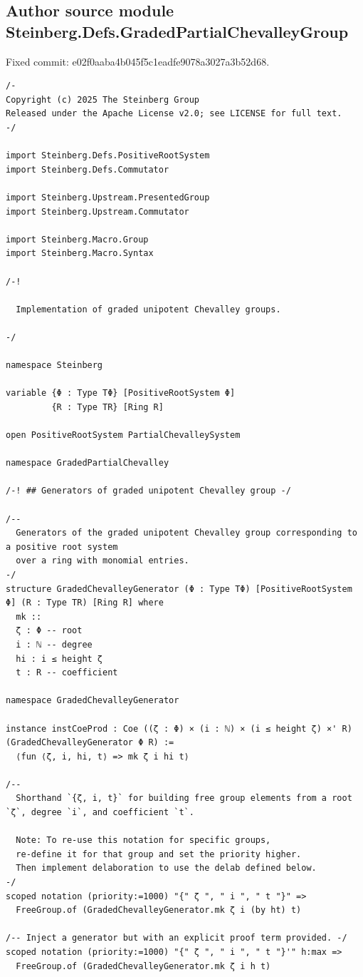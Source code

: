 \documentclass[10pt,a4paper]{article}
\begin{document}
\subsection*{Author source module Steinberg.Defs.GradedPartialChevalleyGroup}
\noindent Fixed commit: e02f0aaba4b045f5c1eadfe9078a3027a3b52d68.
\begin{Verbatim}
/-
Copyright (c) 2025 The Steinberg Group
Released under the Apache License v2.0; see LICENSE for full text.
-/

import Steinberg.Defs.PositiveRootSystem
import Steinberg.Defs.Commutator

import Steinberg.Upstream.PresentedGroup
import Steinberg.Upstream.Commutator

import Steinberg.Macro.Group
import Steinberg.Macro.Syntax

/-!

  Implementation of graded unipotent Chevalley groups.

-/

namespace Steinberg

variable {Φ : Type TΦ} [PositiveRootSystem Φ]
         {R : Type TR} [Ring R]

open PositiveRootSystem PartialChevalleySystem

namespace GradedPartialChevalley

/-! ## Generators of graded unipotent Chevalley group -/

/--
  Generators of the graded unipotent Chevalley group corresponding to a positive root system
  over a ring with monomial entries.
-/
structure GradedChevalleyGenerator (Φ : Type TΦ) [PositiveRootSystem Φ] (R : Type TR) [Ring R] where
  mk ::
  ζ : Φ -- root
  i : ℕ -- degree
  hi : i ≤ height ζ
  t : R -- coefficient

namespace GradedChevalleyGenerator

instance instCoeProd : Coe ((ζ : Φ) × (i : ℕ) × (i ≤ height ζ) ×' R) (GradedChevalleyGenerator Φ R) :=
  ⟨fun ⟨ζ, i, hi, t⟩ => mk ζ i hi t⟩

/--
  Shorthand `{ζ, i, t}` for building free group elements from a root `ζ`, degree `i`, and coefficient `t`.

  Note: To re-use this notation for specific groups,
  re-define it for that group and set the priority higher.
  Then implement delaboration to use the delab defined below.
-/
scoped notation (priority:=1000) "{" ζ ", " i ", " t "}" =>
  FreeGroup.of (GradedChevalleyGenerator.mk ζ i (by ht) t)

/-- Inject a generator but with an explicit proof term provided. -/
scoped notation (priority:=1000) "{" ζ ", " i ", " t "}'" h:max =>
  FreeGroup.of (GradedChevalleyGenerator.mk ζ i h t)


\end{Verbatim}
\end{document}
